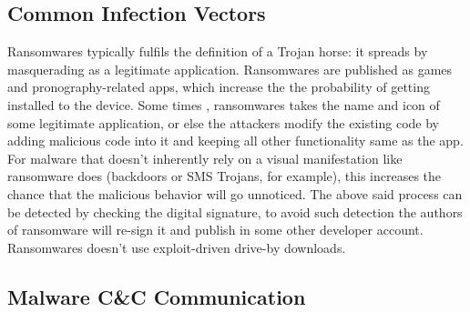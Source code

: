 \subsection{Common Infection Vectors}

Ransomwares typically fulfils the definition of a Trojan horse: it spreads by masquerading as a legitimate application. 
Ransomwares are published as games and pronography-related apps, which increase the the probability of getting installed to the device. 
Some times , ransomwares takes the name and icon of some legitimate application, or else the attackers modify the existing code by adding malicious code into it and keeping all other functionality same as the app.
For malware that doesn’t inherently rely on a visual manifestation like ransomware does (backdoors or SMS Trojans, for example), this increases the chance that the malicious behavior will go unnoticed. 
The above said process can be detected by checking the digital signature, to avoid such detection the authors of ransomware will re-sign it and publish in some other developer account.  
Ransomwares doesn't use exploit-driven drive-by downloads.

\subsection{Malware C\&C Communication}

